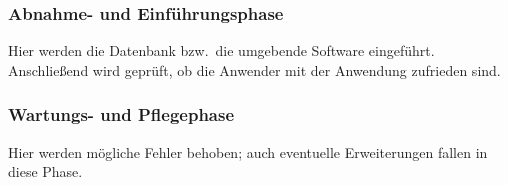 \subsubsection{Abnahme- und Einführungsphase}
Hier werden die Datenbank bzw.\ die umgebende Software eingeführt. Anschließend wird geprüft, ob die Anwender mit der Anwendung zufrieden sind.

\subsubsection{Wartungs- und Pflegephase}
Hier werden mögliche Fehler behoben; auch eventuelle Erweiterungen fallen in diese Phase.

\newpage